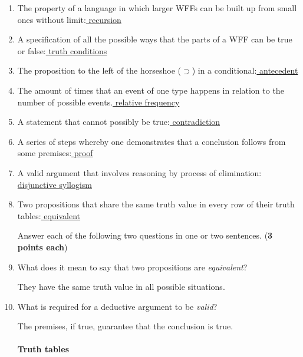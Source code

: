 \documentclass[10pt]{article}
\begin{document}
\begin{enumerate}\setlength\itemsep{5mm}
 \item The property of a language in which larger WFFs can be built up from small ones without limit:\underline{ recursion }
 
 \item A specification of all the possible ways that the parts of a WFF can be true or false:\underline{ truth conditions }
 
 \item The proposition to the left of the horseshoe ($\supset$) in a conditional:\underline{ antecedent }
 
 \item The amount of times that an event of one type happens in relation to the number of possible events.\underline{ relative frequency }
 
 \item A statement that cannot possibly be true:\underline{ contradiction }
 
 \item A series of steps whereby one demonstrates that a conclusion follows from some premises:\underline{ proof }
 
 \item A valid argument that involves reasoning by process of elimination:\underline{ disjunctive syllogism }
 
 \item Two propositions that share the same truth value in every row of their truth tables:\underline{ equivalent }
 

Answer each of the following two questions in one or two sentences. (\textbf{3 points each})

\setlength\itemsep{1cm}

\item What does it mean to say that two propositions are \textit{equivalent}?

They have the same truth value in all possible situations.

\item What is required for a deductive argument to be \textit{valid}?

The premises, if true, guarantee that the conclusion is true.


\paragraph{Truth tables}


\end{enumerate}
\end{document}

